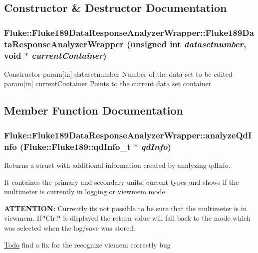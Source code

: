 \subsection{Constructor \& Destructor Documentation}
\hypertarget{classFluke_1_1Fluke189DataResponseAnalyzerWrapper_af4f891231353edf2c9a20743d3018b1e}{
\subsubsection[{Fluke189DataResponseAnalyzerWrapper}]{\setlength{\rightskip}{0pt plus 5cm}Fluke::Fluke189DataResponseAnalyzerWrapper::Fluke189DataResponseAnalyzerWrapper (unsigned int {\em datasetnumber}, \/  void $\ast$ {\em currentContainer})}}
\label{classFluke_1_1Fluke189DataResponseAnalyzerWrapper_af4f891231353edf2c9a20743d3018b1e}
Constructor param\mbox{[}in\mbox{]} datasetnumber Number of the data set to be edited param\mbox{[}in\mbox{]} currentContainer Points to the current data set container 

\subsection{Member Function Documentation}
\hypertarget{classFluke_1_1Fluke189DataResponseAnalyzerWrapper_a2bec1dad601bc993375d358ef77c7e6b}{
\subsubsection[{analyzeQdInfo}]{ Fluke::Fluke189DataResponseAnalyzerWrapper::analyzeQdInfo ({\bf Fluke::Fluke189::qdInfo\_\-t} $\ast$ {\em qdInfo})}}
\label{classFluke_1_1Fluke189DataResponseAnalyzerWrapper_a2bec1dad601bc993375d358ef77c7e6b}
Returns a struct with additional information created by analyzing qdInfo.\par
 It containes the primary and secondary units, current types and shows if the multimeter is currently in logging or viewmem mode\par
 {\bfseries ATTENTION:} Currently its not possible to be sure that the multimeter is in viewmem. If \char`\"{}Clr?\char`\"{} is displayed the return value will fall back to the mode which was selected when the log/save was stored. \begin{Desc}
\item[\hyperlink{todo__todo000022}{Todo}]find a fix for the recognize viemem correctly bug \end{Desc}

